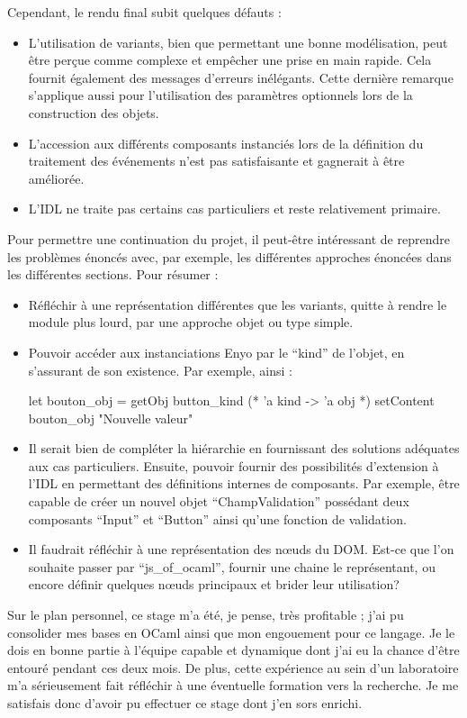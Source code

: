 \documentclass[11pt,a4paper]{report}
\begin{document}
Cependant, le rendu final subit quelques défauts : 
\begin{itemize}
\item L'utilisation de variants, bien que permettant 
  une bonne modélisation, peut être perçue comme complexe et empêcher une prise en main rapide. Cela fournit
  également des messages d'erreurs inélégants. 
  Cette dernière remarque s'applique aussi pour l'utilisation des paramètres optionnels lors de la
  construction des objets.
\item L'accession aux différents composants instanciés lors de la définition du traitement 
  des événements n'est pas satisfaisante et gagnerait à être améliorée.
\item L'IDL ne traite pas certains cas particuliers et reste relativement primaire.    
\end{itemize}\medskip

Pour permettre une continuation du projet, il peut-être intéressant de reprendre les problèmes
énoncés avec, par exemple, les différentes approches énoncées dans les différentes sections. Pour résumer :
\begin{itemize}
\item Réfléchir à une représentation différentes que les variants, quitte à rendre le
  module plus lourd, par une approche objet ou type simple.
\item Pouvoir accéder aux instanciations Enyo par le ``kind'' de l'objet, en s'assurant
  de son existence. Par exemple, ainsi :
  \begin{OCaml}
    let bouton_obj = getObj button_kind (* 'a kind -> 'a obj *)
    setContent bouton_obj "Nouvelle valeur"
  \end{OCaml}
\item Il serait bien de compléter la hiérarchie en fournissant des solutions adéquates
  aux cas particuliers. Ensuite, pouvoir fournir des possibilités d'extension à l'IDL en permettant 
  des définitions internes de composants. Par exemple, être capable  de créer un nouvel objet ``ChampValidation'' 
  possédant deux composants ``Input'' et ``Button'' ainsi qu'une fonction de validation.
\item Il faudrait réfléchir à une représentation des n\oe{}uds du DOM. Est-ce que l'on souhaite passer 
  par ``js\_of\_ocaml'', fournir une chaine le représentant, ou encore définir quelques n\oe{}uds principaux
  et brider leur utilisation?
\end{itemize}\medskip

Sur le plan personnel, ce stage m'a été, je pense, très profitable ; j'ai pu consolider mes bases en OCaml
ainsi que mon engouement pour ce langage. Je le dois en bonne partie à l'équipe capable et dynamique
dont j'ai eu la chance d'être entouré pendant ces deux mois.
De plus, cette expérience au sein d'un laboratoire m'a sérieusement fait réfléchir à 
une éventuelle formation vers la recherche.
Je me satisfais donc d'avoir pu effectuer ce stage dont j'en sors enrichi.
\end{document}
